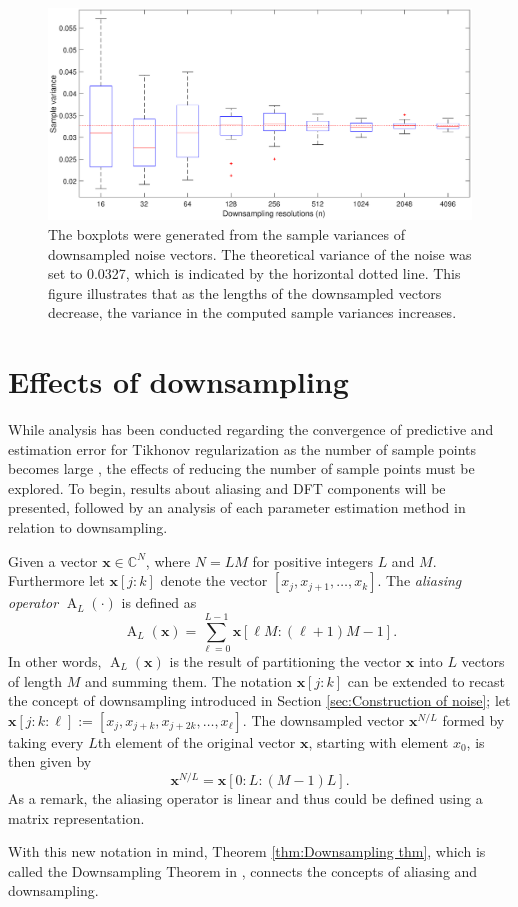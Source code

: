 \documentclass[12pt]{book}
\DeclareMathOperator{\alias}{A}	%
\begin{document}
\begin{figure}[htb]
\centerline{\includegraphics[scale=0.45]{Figures/VarPlot1D_F1_S05_W100_R20.eps}}
\caption{The boxplots were generated from the sample variances of downsampled noise vectors. The theoretical variance of the noise was set to 0.0327, which is indicated by the horizontal dotted line. This figure illustrates that as the lengths of the downsampled vectors decrease, the variance in the computed sample variances increases.}
\label{VarPlot1D}
\end{figure}

\chapter{Effects of downsampling} \label{sec:Effects of downsampling}
While analysis has been conducted regarding the convergence of predictive and estimation error for Tikhonov regularization as the number of sample points becomes large \cite{Vogel:2002}, the effects of reducing the number of sample points must be explored. To begin, results about aliasing and DFT components will be presented, followed by an analysis of each parameter estimation method in relation to downsampling. \par 
Given a vector $\mathbf{x} \in \mathbb{C}^N$, where $N = LM$ for positive integers $L$ and $M$. Furthermore let $\mathbf{x}[j:k]$ denote the vector $[x_j, x_{j+1},\ldots,x_k]$. The \textit{aliasing operator} $\alias_L(\cdot)$ is defined as
\[\alias_L(\mathbf{x}) = \sum_{\ell=0}^{L-1} \mathbf{x}[\ell{M}:(\ell+1)M-1].\]
In other words, $\alias_L(\mathbf{x})$ is the result of partitioning the vector $\mathbf{x}$ into $L$ vectors of length $M$ and summing them. The notation $\mathbf{x}[j:k]$ can be extended to recast the concept of downsampling introduced in Section \ref{sec:Construction of noise}; let $\mathbf{x}[j:k:\ell] := [x_{j},x_{j+k},x_{j+2k},\ldots,x_\ell]$. The downsampled vector $\mathbf{x}^{N/L}$ formed by taking every $L$th element of the original vector $\mathbf{x}$, starting with element $x_0$, is then given by
\[\mathbf{x}^{N/L} = \mathbf{x}[0:L:(M-1)L].\]
As a remark, the aliasing operator is linear and thus could be defined using a matrix representation. \par 
With this new notation in mind, Theorem \ref{thm:Downsampling thm}, which is called the Downsampling Theorem in \cite{AudioDFT}, connects the concepts of aliasing and downsampling.
\end{document}
